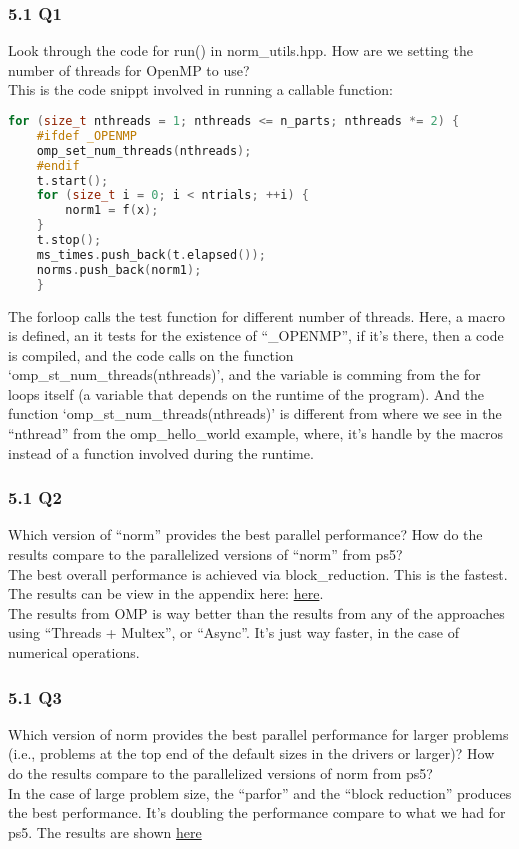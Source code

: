 \documentclass[]{article}
\begin{document}
    \subsubsection*{5.1 Q1}
        Look through the code for run() in norm\_utils.hpp. How are we setting the number of threads for OpenMP to use?
        \\[1.1em]
        This is the code snippt involved in running a callable function: 
        \begin{lstlisting}[language=c]
for (size_t nthreads = 1; nthreads <= n_parts; nthreads *= 2) {
    #ifdef _OPENMP
    omp_set_num_threads(nthreads);
    #endif
    t.start();
    for (size_t i = 0; i < ntrials; ++i) {
        norm1 = f(x);
    }
    t.stop();
    ms_times.push_back(t.elapsed());
    norms.push_back(norm1);
    }
        \end{lstlisting}
        The forloop calls the test function for different number of threads. Here, a macro is defined, an it tests for the existence of ``\_OPENMP'', if it's there, then a code is compiled, and the code calls on the function `omp\_st\_num\_threads(nthreads)', and the variable is comming from the for loops itself (a variable that depends on the runtime of the program). And the function `omp\_st\_num\_threads(nthreads)' is different from where we see in the ``nthread'' from the omp\_hello\_world example, where, it's handle by the macros instead of a function involved during the runtime. 
    \subsubsection*{5.1 Q2}
        Which version of ``norm'' provides the best parallel performance?  How do the results compare to the parallelized versions of ``norm'' from ps5?
        \\[1.1em]
        The best overall performance is achieved via block\_reduction. This is the fastest. The results can be view in the appendix here: \hyperref[5.2.appendix]{here}. 
        \\
        The results from OMP is way better than the results from any of the approaches using ``Threads + Multex'',  or ``Async''. It's just way faster, in the case of numerical operations. 
    \subsubsection*{5.1 Q3}
        Which version of norm provides the best parallel performance for larger problems (i.e., problems at the top end of the default sizes in the drivers or larger)? How do the results compare to the parallelized versions of norm from ps5? 
        \\[1.1em]
        In the case of large problem size, the ``parfor'' and the ``block reduction'' produces the best performance. It's doubling the performance compare to what we had for ps5. The results are shown \hyperref[5.2.appendix]{here}
\end{document}
